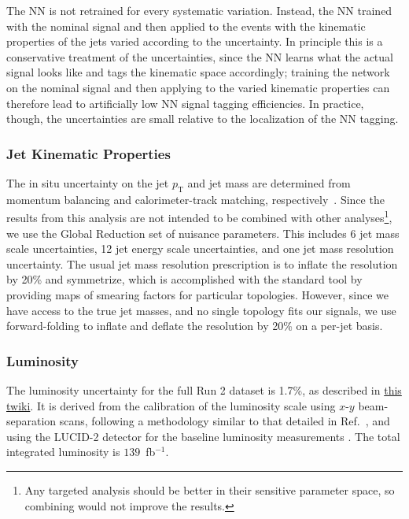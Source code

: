 The NN is not retrained for every systematic variation.
Instead, the NN trained with the nominal signal and then applied to the events with the kinematic properties of the jets varied according to the uncertainty.
In principle this is a conservative treatment of the uncertainties, since the NN learns what the actual signal looks like and tags the kinematic space accordingly;
training the network on the nominal signal and then applying to the varied kinematic properties can therefore lead to artificially low NN signal tagging efficiencies.
In practice, though, the uncertainties are small relative to the localization of the NN tagging.

\subsubsection{Jet Kinematic Properties}
The in situ uncertainty on the jet $p_\text{T}$ and jet mass are determined from momentum balancing and calorimeter-track matching, respectively~\cite{Aaboud:2018kfi}.
Since the results from this analysis are not intended to be combined with other analyses\footnote{Any targeted analysis should be better in their sensitive parameter space, so combining would not improve the results.}, we use the Global Reduction set of nuisance parameters.
This includes 6 jet mass scale uncertainties, 12 jet energy scale uncertainties, and one jet mass resolution uncertainty.
The usual jet mass resolution prescription is to inflate the resolution by 20\% and symmetrize, which is accomplished with the standard tool by providing maps of smearing factors for particular topologies.
However, since we have access to the true jet masses, and no single topology fits our signals, we use forward-folding to inflate and deflate the resolution by 20\% on a per-jet basis. 

\subsubsection{Luminosity}

The luminosity uncertainty for the full Run 2 dataset is 1.7\%, as described in \href{https://twiki.cern.ch/twiki/bin/viewauth/Atlas/LuminosityForPhysics#2018_13_TeV_proton_proton_Morion}{this twiki}.   It is derived from the calibration of the luminosity scale using $x$-$y$ beam-separation scans, following a methodology similar to that detailed in Ref.~\cite{Aaboud:2016hhf}, and using the LUCID-2 detector for the baseline luminosity measurements \cite{LUCID2}.  The total integrated luminosity is $139$~fb$^{-1}$.

